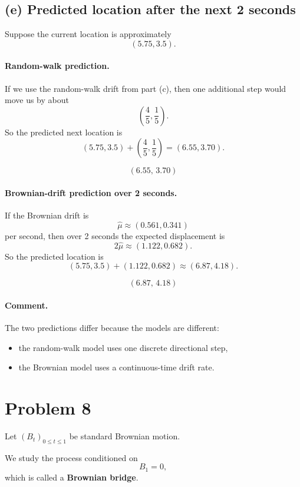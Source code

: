 \documentclass[11pt]{article}
\begin{document}
\subsection*{(e) Predicted location after the next 2 seconds}

Suppose the current location is approximately
\[
(5.75,3.5).
\]

\paragraph{Random-walk prediction.}

If we use the random-walk drift from part (c), then one additional step would move us by about
\[
\left(\frac45,\frac15\right).
\]
So the predicted next location is
\[
(5.75,3.5)+\left(\frac45,\frac15\right)
=
(6.55,3.70).
\]

\[
\boxed{(6.55,\,3.70)}
\]

\paragraph{Brownian-drift prediction over 2 seconds.}

If the Brownian drift is
\[
\hat\mu\approx (0.561,0.341)
\]
per second, then over 2 seconds the expected displacement is
\[
2\hat\mu \approx (1.122,0.682).
\]
So the predicted location is
\[
(5.75,3.5)+(1.122,0.682)\approx (6.87,4.18).
\]

\[
\boxed{(6.87,\,4.18)}
\]

\paragraph{Comment.}  
The two predictions differ because the models are different:
\begin{itemize}[leftmargin=1.5em]
    \item the random-walk model uses one discrete directional step,
    \item the Brownian model uses a continuous-time drift rate.
\end{itemize}

\newpage

\section*{Problem 8}

Let $(B_t)_{0\le t\le 1}$ be standard Brownian motion.

We study the process conditioned on
\[
B_1=0,
\]
which is called a \textbf{Brownian bridge}.
\end{document}
